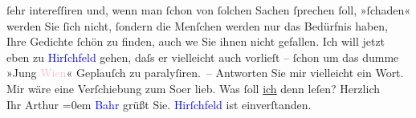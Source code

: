                     ſehr intereſſiren {\pb}und, wenn man ſchon von
                    ſolchen Sachen ſprechen ſoll, »ſchaden« werden Sie ſich nicht, ſondern die
                    Menſchen werden nur das Bedürfnis haben, Ihre Gedichte ſchön zu finden, auch
                        we{\geminationn}
               Sie ihnen nicht gefallen. Ich will jetzt
                    eben zu \textcolor{blue}{Hirſchfeld}{}\ledrightnote{\textcolor{blue}{Georg Hirschfeld}} gehen, daſs {\pb}er vielleicht auch vorlieſt – ſchon um das dumme
                    »Jung \textcolor{pink}{Wien}{}\ledrightnote{\textcolor{pink}{Wien}}« Geplauſch zu
                    paralyſiren. –\pend
           \pstart
           Antworten Sie mir vielleicht ein Wort.\pend
           \pstart
           Mir wäre eine Verſchiebung zum So{\geminationm}er lieb. Was ſoll
                        \uline{ich} denn leſen?\pend
           \pstart
           {\pb}Herzlich{\\[\baselineskip]}Ihr \spacefill\mbox{Arthur}\pend
           \leftskip=0em{}\pstart
           \noindent{}\textcolor{blue}{Bahr}{}\ledrightnote{\textcolor{blue}{Hermann Bahr}} grüßt Sie.\pend
           \pstart
           \noindent{}\textcolor{blue}{Hirſchfeld}{}\ledrightnote{\textcolor{blue}{Georg Hirschfeld}} ist einverſtanden.\pend
           \pstart
           \textcolor{gray}{\textbf{\label{T_L00649_1v}\label{T_L00649_1h}}}\pend
           \endnumbering{}  
      